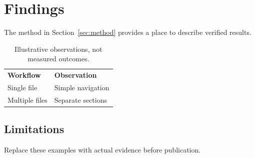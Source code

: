 \chapter{Findings}
The method in Section~\ref{sec:method} provides a place to describe verified results.
\begin{table}[h]
\centering
\begin{tabular}{ll}
\textbf{Workflow} & \textbf{Observation}\\
Single file & Simple navigation\\
Multiple files & Separate sections
\end{tabular}
\caption{Illustrative observations, not measured outcomes.}
\end{table}
\section{Limitations}
Replace these examples with actual evidence before publication.
